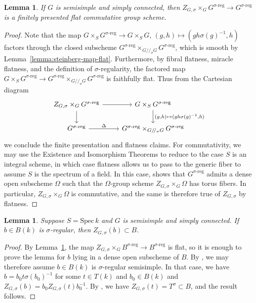 \documentclass[11pt,reqno]{amsart}
\newtheorem{lemma}[theorem]{Lemma}
\theoremstyle{definition}
\renewcommand{\rm}{\mathrm}
\newcommand{\Spec}{\mathrm{Spec} \,}
\begin{document}
\begin{lemma}\label{lemma:flatness-of-fixed-point-scheme}
    If $G$ is semisimple and simply connected, then $Z_{G,\sigma} \times_G G^{\sigma\textrm{-}\rm{reg}} \to G^{\sigma\textrm{-}\rm{reg}}$ is a finitely presented flat commutative group scheme.
\end{lemma}

\begin{proof}
    Note that the map $G \times_S G^{\sigma\textrm{-}\rm{reg}} \to G \times_S G$, $(g, h) \mapsto (gh\sigma(g)^{-1}, h)$ factors through the closed subscheme $G^{\sigma\textrm{-}\rm{reg}} \times_{G/\!/_\sigma G} G^{\sigma\textrm{-}\rm{reg}}$, which is smooth by Lemma~\ref{lemma:steinberg-map-flat}. Furthermore, by fibral flatness, miracle flatness, and the definition of $\sigma$-regularity, the factored map $G \times_S G^{\sigma\textrm{-}\rm{reg}} \to G^{\sigma\textrm{-}\rm{reg}} \times_{G/\!/_\sigma G} G^{\sigma\textrm{-}\rm{reg}}$ is faithfully flat. Thus from the Cartesian diagram
    \[
    \begin{tikzcd}
        Z_{G,\sigma} \times_G G^{\sigma\textrm{-}\rm{reg}} \arrow[r] \arrow[d]
        &G \times_S G^{\sigma\textrm{-}\rm{reg}} \arrow[d, "{(g, h) \mapsto (gh\sigma(g)^{-1}, h)}"] \\
    G^{\sigma\textrm{-}\rm{reg}} \arrow[r, "\Delta"]
        &G^{\sigma\textrm{-}\rm{reg}} \times_{G/\!/_\sigma G} G^{\sigma\textrm{-}\rm{reg}}
    \end{tikzcd}
    \]
    we conclude the finite presentation and flatness claims. For commutativity, we may use the Existence and Isomorphism Theorems to reduce to the case $S$ is an integral scheme, in which case flatness allows us to pass to the generic fiber to assume $S$ is the spectrum of a field. In this case, \cite[Lemma 5.2.14]{Xiao-Zhu} shows that $G^{\sigma\textrm{-}\rm{reg}}$ admits a dense open subscheme $\Omega$ such that the $\Omega$-group scheme $Z_{G,\sigma} \times_G \Omega$ has torus fibers. In particular, $Z_{G,\sigma} \times_G \Omega$ is commutative, and the same is therefore true of $Z_{G,\sigma}$ by flatness.
\end{proof}

\begin{lemma}\label{lemma:twisted-centralizer-in-B}
    Suppose $S = \Spec k$ and $G$ is semisimple and simply connected. If $b \in B(k)$ is $\sigma$-regular, then $Z_{G,\sigma}(b) \subset B$.
\end{lemma}

\begin{proof}
    By Lemma~\ref{lemma:flatness-of-fixed-point-scheme}, the map $Z_{G,\sigma} \times_{G} B^{\sigma\textrm{-}\rm{reg}} \to B^{\sigma\textrm{-}\rm{reg}}$ is flat, so it is enough to prove the lemma for $b$ lying in a dense open subscheme of $B$. By \cite[Lemma 5.2.14]{Xiao-Zhu}, we may therefore assume $b \in B(k)$ is $\sigma$-regular semisimple. In that case, we have $b = b_0t\sigma(b_0)^{-1}$ for some $t \in T(k)$ and $b_0 \in B(k)$ and $Z_{G,\sigma}(b) = b_0Z_{G,\sigma}(t)b_0^{-1}$. By \cite[Remark 5.2.12]{Xiao-Zhu}, we have $Z_{G,\sigma}(t) = T^\sigma \subset B$, and the result follows.
\end{proof}
\end{document}
